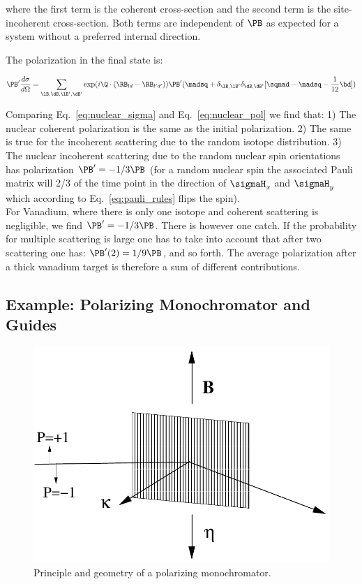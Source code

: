 where the first term is the coherent cross-section and the second term is the
site-incoherent cross-section. Both terms are independent of $\PB$ as expected
for a system without a preferred internal direction.

The polarization in the final state is:

\begin{equation}
  \label{eq:nuclear_pol}
  \PB' \frac{d\sigma}{d\Omega}  =
  \sum_{\lB, \dB, \lB', \dB'} \exp(i \Q \cdot (\RB_{ld}-\RB_{l'd'}))
  \PB' (\madsq + \delta_{\lB,\lB'}\delta_{\dB,\dB'}[\sqmad - \madsq
  - \frac{1}{12}\bd])
\end{equation}

Comparing Eq.~\ref{eq:nuclear_sigma} and Eq.~\ref{eq:nuclear_pol} we
find that: 1) The nuclear coherent polarization is the same as the
initial polarization. 2) The same is true for the incoherent
scattering due to the random isotope distribution. 3) The nuclear
incoherent scattering due to the random nuclear spin orientations has
polarization $\PB' = -1/3 \PB$ (for a random nuclear spin the
associated Pauli matrix will 2/3 of the time point in the direction of
$\sigmaH_x$ and $\sigmaH_y$ which according to
Eq.~\ref{eq:pauli_rules} flips the spin). \\

For Vanadium, where there is only one isotope and coherent scattering
is negligible, we find $\PB' = -1/3\PB$. There is however one
catch. If the probability for multiple scattering is large one has to
take into account that after two scattering one has: $\PB'(2) =
1/9\PB$, and so forth. The average polarization after a thick vanadium
target is therefore a sum of different contributions.

\subsection{Example: Polarizing Monochromator and Guides}
\label{sub:mono}

\begin{figure}[htbp]
  \begin{center}
    \includegraphics[keepaspectratio,
    width=0.7\columnwidth]{figures/monochromator_pol}
    \caption{Principle and geometry of a polarizing monochromator.}
    \label{fig:mono_princip}
  \end{center}
\end{figure}

